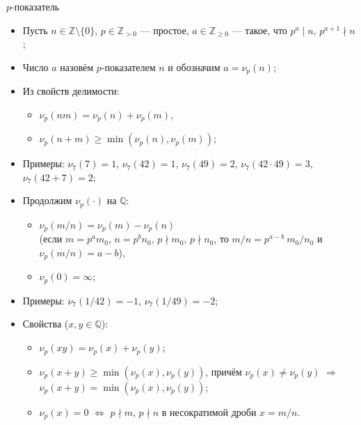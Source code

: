\documentclass[serif, aspectratio=169]{beamer}
\begin{document}
\begin{frame}{$p$-показатель}
    \begin{itemize}
        \item Пусть $n\in\mathbb{Z}\setminus\{0\}$, $p\in\mathbb{Z}_{> 0}$ --- простое, $a\in\mathbb{Z}_{\geqslant 0}$ --- такое, что $p^a \mid n$, $p^{a+1} \nmid n$;
        \item Число $a$ назовём $p$-показателем $n$ и обозначим $a=\nu_p(n)$;
        \item Из свойств делимости:
        \begin{itemize}
            \item $\nu_p(nm)=\nu_p(n)+\nu_p(m)$,
            \item $\nu_p(n+m)\geqslant\min(\nu_p(n),\nu_p(m))$;
        \end{itemize}
        \item Примеры: $\nu_7(7)=1$, $\nu_7(42)=1$, $\nu_7(49)=2$, $\nu_7(42\cdot49)=3$, $\nu_7(42+7)=2$;
        \item Продолжим $\nu_p(\cdot)$ на $\mathbb{Q}$:
        \begin{itemize}
            \item $\nu_p(m/n)=\nu_p(m)-\nu_p(n)$\\
            (если $m=p^a m_0$, $n=p^b n_0$, $p\nmid m_0$, $p\nmid n_0$, то $m/n=p^{a-b}\ m_0/n_0$ и $\nu_p(m/n)=a-b$),
            \item $\nu_p(0)=\infty$;
        \end{itemize}
        \item Примеры: $\nu_7(1/42)=-1$, $\nu_7(1/49)=-2$;
        \item Свойства ($x,y\in\mathbb{Q}$):
        \begin{itemize}
            \item $\nu_p(xy)=\nu_p(x)+\nu_p(y)$;
            \item $\nu_p(x+y)\geqslant\min(\nu_p(x),\nu_p(y))$, причём $\nu_p(x)\neq\nu_p(y)$ $\Rightarrow$ $\nu_p(x+y)=\min(\nu_p(x),\nu_p(y))$;
            \item $\nu_p(x)=0$ $\Leftrightarrow$ $p\nmid m$, $p\nmid n$ в несократимой дроби $x=m/n$.
        \end{itemize}
    \end{itemize}
    
    \note{
        \begin{itemize}
            \item ---
        \end{itemize}
    }
\end{frame}
\end{document}
